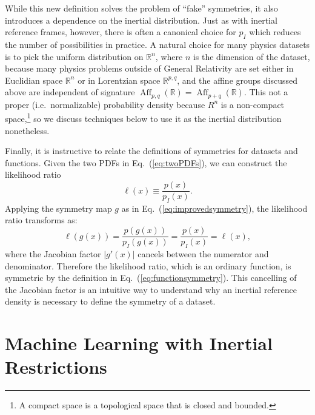 \documentclass[aps,prx,reprint,preprintnumbers,superscriptaddress,nofootinbib,longbibliography,floatfix]{revtex4-1}
\newcommand{\R}{\mathbb{R}}
\DeclareRobustCommand{\Eq}[1]{Eq.~(\ref{eq:#1})}
\begin{document}
While this new definition solves the problem of ``fake'' symmetries, it also introduces a dependence on the inertial distribution.  
%
Just as with inertial reference frames, however, there is often a canonical choice for $p_I$ which reduces the number of possibilities in practice.
%
A natural choice for many physics datasets is to pick the uniform distribution on $\mathbb{R}^{n}$, where $n$ is the dimension of the dataset, because many physics problems outside of General Relativity are set either in Euclidian space $\R^n$ or in Lorentzian space $\R^{p, q}$, and the affine groups discussed above are independent of signature $\operatorname{Aff}_{p, q}(\R) = \operatorname{Aff}_{p+q}(\R)$.
%
This not a proper (i.e.\ normalizable) probability density because $R^n$ is a non-compact space,\footnote{A compact space is a topological space that is closed and bounded.} so we discuss techniques below to use it as the inertial distribution nonetheless.


Finally, it is instructive to relate the definitions of symmetries for datasets and functions.
%
Given the two PDFs in \Eq{twoPDFs}, we can construct the likelihood ratio
%
\begin{equation}
    \ell(x) \equiv \frac{p(x)}{p_I(x)}.
\end{equation}
%
Applying the symmetry map $g$ as in \Eq{improvedsymmetry}, the likelihood ratio transforms as:
\begin{equation}
    \ell(g(x)) = \frac{p(g(x))}{p_I(g(x))} = \frac{p(x)}{p_I(x)} = \ell(x),
\end{equation}
%
where the Jacobian factor $|g'(x)|$ cancels between the numerator and denominator.
%
Therefore the likelihood ratio, which is an ordinary function, is symmetric by the definition in \Eq{functionsymmetry}.
%
This cancelling of the Jacobian factor is an intuitive way to understand why an inertial reference density is necessary to define the symmetry of a dataset.



\section{Machine Learning with Inertial Restrictions}
\label{sec:MLa}
\end{document}
